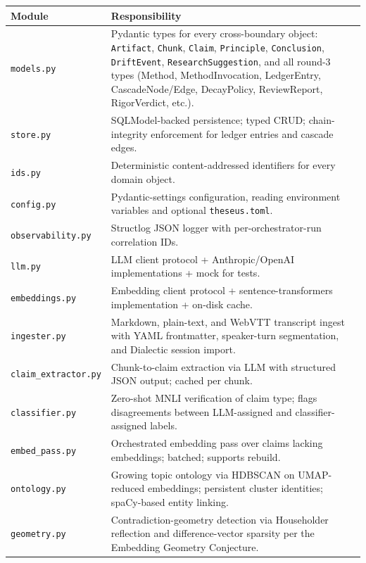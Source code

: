 \documentclass[11pt,letterpaper]{article}
\newcommand{\mod}[1]{\texttt{#1}}
\newcommand{\file}[1]{\texttt{#1}}
\begin{document}
\begin{longtable}{p{3.5cm} p{11cm}}
\toprule
\textbf{Module} & \textbf{Responsibility} \\
\midrule
\endhead
\mod{models.py}             & Pydantic types for every cross-boundary object: \texttt{Artifact}, \texttt{Chunk}, \texttt{Claim}, \texttt{Principle}, \texttt{Conclusion}, \texttt{DriftEvent}, \texttt{ResearchSuggestion}, and all round-3 types (Method, MethodInvocation, LedgerEntry, CascadeNode/Edge, DecayPolicy, ReviewReport, RigorVerdict, etc.). \\
\mod{store.py}              & SQLModel-backed persistence; typed CRUD; chain-integrity enforcement for ledger entries and cascade edges. \\
\mod{ids.py}                & Deterministic content-addressed identifiers for every domain object. \\
\mod{config.py}             & Pydantic-settings configuration, reading environment variables and optional \file{theseus.toml}. \\
\mod{observability.py}      & Structlog JSON logger with per-orchestrator-run correlation IDs. \\
\mod{llm.py}                & LLM client protocol + Anthropic/OpenAI implementations + mock for tests. \\
\mod{embeddings.py}         & Embedding client protocol + sentence-transformers implementation + on-disk cache. \\
\mod{ingester.py}           & Markdown, plain-text, and WebVTT transcript ingest with YAML frontmatter, speaker-turn segmentation, and Dialectic session import. \\
\mod{claim\_extractor.py}   & Chunk-to-claim extraction via LLM with structured JSON output; cached per chunk. \\
\mod{classifier.py}         & Zero-shot MNLI verification of claim type; flags disagreements between LLM-assigned and classifier-assigned labels. \\
\mod{embed\_pass.py}        & Orchestrated embedding pass over claims lacking embeddings; batched; supports rebuild. \\
\mod{ontology.py}           & Growing topic ontology via HDBSCAN on UMAP-reduced embeddings; persistent cluster identities; spaCy-based entity linking. \\
\mod{geometry.py}           & Contradiction-geometry detection via Householder reflection and difference-vector sparsity per the Embedding Geometry Conjecture. \\

\end{longtable}
\end{document}
